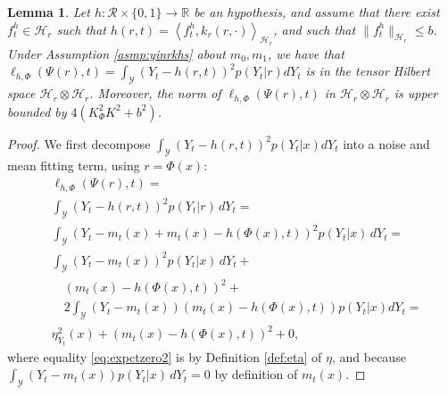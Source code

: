 \documentclass{article}
\newtheorem{thmapplem}{Lemma}
\def\cY{\mathcal Y}
\def\cH{\mathcal H}
\def\cR{\mathcal{R}}
\def \R{\mathbb{R}}
\newcommand{\lythr}{\ell_{h,\Phi}(\Psi(r),t)}
\begin{document}
\begin{thmapplem}\label{lem:mmdbound}
Let $h : \cR \times \{0,1\} \rightarrow \R$ be an hypothesis, and assume that there exist $f^h_t \in \cH_r$ such that $h(r,t) = \left<f^h_t,k_r(r,\cdot)\right>_{\cH_r}$, and such that $\|f^h_t\|_{\cH_r} \leq b$.
Under Assumption \ref{asmp:yinrkhs} about $m_0,m_1$, we have that $\lythr = \int_\cY \left(Y_t - h(r,t)\right)^2 p(Y_t|r) dY_t$ is in the tensor Hilbert space $\cH_r \otimes \cH_r$. Moreover, the norm of $\lythr$ in $\cH_r \otimes \cH_r$ is upper bounded by $4\left(K_\Phi^2 K^2 + b^2\right)$.
\end{thmapplem}
\begin{proof}
We first decompose $\int_\cY \left(Y_t - h(r,t)\right)^2 p(Y_t|x) dY_t$ into a noise and mean fitting term, using $r=\Phi(x)$:
\begin{align}
&\lythr = \nonumber \\
&\int_\cY \left(Y_t - h(r,t)\right)^2 p(Y_t|r) \, dY_t = \nonumber \\
&\int_\cY \left(Y_t - m_t(x) + m_t(x) - h(\Phi(x),t)\right)^2 p(Y_t|x) \, dY_t =\nonumber \\
&\int_\cY \left(Y_t - m_t(x) \right)^2 p(Y_t|x) \, dY_t + \nonumber \\
& \quad  \left(m_t(x) - h(\Phi(x),t)\right)^2  + \nonumber \\
& \quad 2 \int_\cY \left(Y_t - m_t(x) \right)\left(m_t(x) - h(\Phi(x),t)\right) p(Y_t|x) dY_t   =\label{eq:expctzero2} \\
& \eta^2_{Y_t}(x) +  \left(m_t(x) - h(\Phi(x),t)\right)^2  + 0, \label{eq:mmddecomp}
\end{align}
where equality \eqref{eq:expctzero2} is by Definition \ref{def:eta} of $\eta$, and because $\int_\cY \left(Y_t - m_t(x)\right) p(Y_t|x) \, dY_t = 0$ by definition of $m_t(x)$.


\end{proof}
\end{document}
